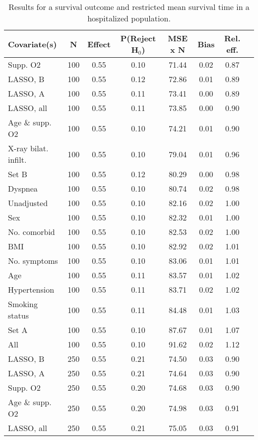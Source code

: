 \documentclass{article}
\begin{document}
\clearpage

{\tabcolsep=6pt  %
\begin{longtable}{lccccccc}
\caption{Results for a survival outcome and restricted mean survival time in a hospitalized population.}\label{tab2}\\
Covariate(s) & N & Effect & P(Reject H$_0$) & MSE x N & Bias & Rel. eff.\\ \midrule
Supp. O2 & 100 & 0.55 & 0.10 & 71.44 & 0.02 & 0.87\\
LASSO, B & 100 & 0.55 & 0.12 & 72.86 & 0.01 & 0.89\\
LASSO, A & 100 & 0.55 & 0.11 & 73.41 & 0.00 & 0.89\\
LASSO, all & 100 & 0.55 & 0.11 & 73.85 & 0.00 & 0.90\\
Age \& supp. O2 & 100 & 0.55 & 0.10 & 74.21 & 0.01 & 0.90\\
X-ray bilat. infilt. & 100 & 0.55 & 0.10 & 79.04 & 0.01 & 0.96\\
Set B & 100 & 0.55 & 0.12 & 80.29 & 0.00 & 0.98\\
Dyspnea & 100 & 0.55 & 0.10 & 80.74 & 0.02 & 0.98\\
Unadjusted & 100 & 0.55 & 0.10 & 82.16 & 0.02 & 1.00\\
Sex & 100 & 0.55 & 0.10 & 82.32 & 0.01 & 1.00\\
No. comorbid & 100 & 0.55 & 0.10 & 82.53 & 0.02 & 1.00\\
BMI & 100 & 0.55 & 0.10 & 82.92 & 0.02 & 1.01\\
No. symptoms & 100 & 0.55 & 0.10 & 83.06 & 0.01 & 1.01\\
Age & 100 & 0.55 & 0.11 & 83.57 & 0.01 & 1.02\\
Hypertension & 100 & 0.55 & 0.11 & 83.71 & 0.02 & 1.02\\
Smoking status & 100 & 0.55 & 0.11 & 84.48 & 0.01 & 1.03\\
Set A & 100 & 0.55 & 0.10 & 87.67 & 0.01 & 1.07\\
All & 100 & 0.55 & 0.10 & 91.62 & 0.02 & 1.12\\ \midrule
LASSO, B & 250 & 0.55 & 0.21 & 74.50 & 0.03 & 0.90\\
LASSO, A & 250 & 0.55 & 0.21 & 74.64 & 0.03 & 0.90\\
Supp. O2 & 250 & 0.55 & 0.20 & 74.68 & 0.03 & 0.90\\
Age \& supp. O2 & 250 & 0.55 & 0.20 & 74.98 & 0.03 & 0.91\\
LASSO, all & 250 & 0.55 & 0.21 & 75.05 & 0.03 & 0.91\\

\end{longtable}}
\end{document}
